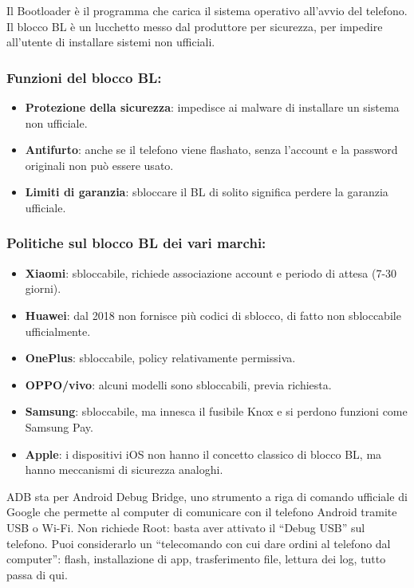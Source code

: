 
Il Bootloader è il programma che carica il sistema operativo all'avvio del telefono. Il blocco BL è un lucchetto messo dal produttore per sicurezza, per impedire all'utente di installare sistemi non ufficiali.

\subsubsection*{Funzioni del blocco BL:}

\begin{itemize}
  \item \textbf{Protezione della sicurezza}: impedisce ai malware di installare un sistema non ufficiale.
  \item \textbf{Antifurto}: anche se il telefono viene flashato, senza l'account e la password originali non può essere usato.
  \item \textbf{Limiti di garanzia}: sbloccare il BL di solito significa perdere la garanzia ufficiale.
\end{itemize}

\subsubsection*{Politiche sul blocco BL dei vari marchi:}

\begin{itemize}
  \item \textbf{Xiaomi}: sbloccabile, richiede associazione account e periodo di attesa (7-30 giorni).
  \item \textbf{Huawei}: dal 2018 non fornisce più codici di sblocco, di fatto non sbloccabile ufficialmente.
  \item \textbf{OnePlus}: sbloccabile, policy relativamente permissiva.
  \item \textbf{OPPO/vivo}: alcuni modelli sono sbloccabili, previa richiesta.
  \item \textbf{Samsung}: sbloccabile, ma innesca il fusibile Knox e si perdono funzioni come Samsung Pay.
  \item \textbf{Apple}: i dispositivi iOS non hanno il concetto classico di blocco BL, ma hanno meccanismi di sicurezza analoghi.
\end{itemize}


ADB sta per Android Debug Bridge, uno strumento a riga di comando ufficiale di Google che permette al computer di comunicare con il telefono Android tramite USB o Wi-Fi. Non richiede Root: basta aver attivato il “Debug USB” sul telefono. Puoi considerarlo un “telecomando con cui dare ordini al telefono dal computer”: flash, installazione di app, trasferimento file, lettura dei log, tutto passa di qui.


